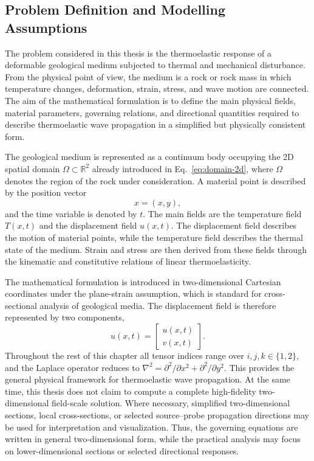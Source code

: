 \subsection{Problem Definition and Modelling Assumptions}

The problem considered in this thesis is the thermoelastic response of a deformable geological medium subjected to thermal and mechanical disturbance. From the physical point of view, the medium is a rock or rock mass in which temperature changes, deformation, strain, stress, and wave motion are connected. The aim of the mathematical formulation is to define the main physical fields, material parameters, governing relations, and directional quantities required to describe thermoelastic wave propagation in a simplified but physically consistent form.

The geological medium is represented as a continuum body occupying the 2D spatial domain $\Omega\subset\mathbb{R}^2$ already introduced in Eq.~\eqref{eq:domain-2d},
where \(\Omega\) denotes the region of the rock under consideration. A material point is described by the position vector
\begin{equation}
x = (x, y),
\end{equation}
and the time variable is denoted by \(t\). The main fields are the temperature field \(T(x,t)\) and the displacement field \(u(x,t)\). The displacement field describes the motion of material points, while the temperature field describes the thermal state of the medium. Strain and stress are then derived from these fields through the kinematic and constitutive relations of linear thermoelasticity.

The mathematical formulation is introduced in two-dimensional Cartesian coordinates under the plane-strain assumption, which is standard for cross-sectional analysis of geological media. The displacement field is therefore represented by two components,
\begin{equation}
u(x,t) =
\begin{bmatrix}
u(x,t) \\
v(x,t)
\end{bmatrix}.
\end{equation}
Throughout the rest of this chapter all tensor indices range over \(i,j,k \in \{1,2\}\), and the Laplace operator reduces to \(\nabla^2 = \partial^2/\partial x^2 + \partial^2/\partial y^2\).
This provides the general physical framework for thermoelastic wave propagation. At the same time, this thesis does not claim to compute a complete high-fidelity two-dimensional field-scale solution. Where necessary, simplified two-dimensional sections, local cross-sections, or selected source--probe propagation directions may be used for interpretation and visualization. Thus, the governing equations are written in general two-dimensional form, while the practical analysis may focus on lower-dimensional sections or selected directional responses.

